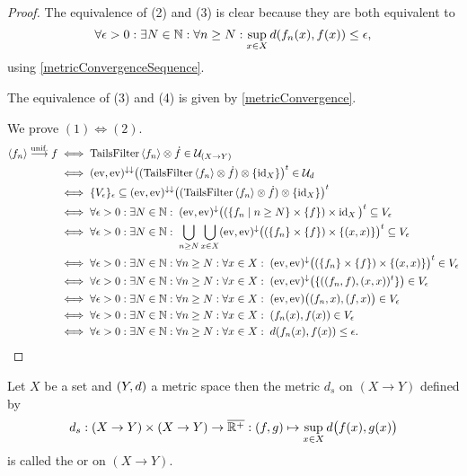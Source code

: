 \begin{proof}
The equivalence of (2) and (3) is clear because they are both equivalent to
\[ \forall \epsilon > 0: \exists N\in \mathbb{N}: \forall n \geq N: \sup_{x\in X} d(f_n(x), f(x)) \leq \epsilon, \]
using \ref{metricConvergenceSequence}.

The equivalence of (3) and (4) is given by \ref{metricConvergence}.

We prove $(1) \Leftrightarrow (2)$.
\begin{align*}
\seq{f_n} \overset{\text{unif.}}{\longrightarrow} f &\iff \TailsFilter\seq{f_n} \otimes \pfilter{f} \in \mathcal{U}_{(X\to Y)} \\
&\iff (\evalMap, \evalMap)^{\imf\imf}\big((\TailsFilter\seq{f_n} \otimes \pfilter{f})\otimes \{\id_X\}\big)^\ttransp \in \mathcal{U}_d \\
&\iff \{V_\epsilon\}_\epsilon \subseteq (\evalMap, \evalMap)^{\imf\imf}\big((\TailsFilter\seq{f_n} \otimes \pfilter{f})\otimes \{\id_X\}\big)^\ttransp \\
&\iff \forall \epsilon>0: \exists N\in \N: \; (\evalMap, \evalMap)^{\imf}\big((\setbuilder{f_n}{n\geq N} \times \{f\})\times \id_X\big)^\ttransp \subseteq V_\epsilon \\
&\iff \forall \epsilon>0: \exists N\in \N: \; \bigcup_{n\geq N}\bigcup_{x\in X}(\evalMap, \evalMap)^{\imf}\big((\{f_n\} \times \{f\})\times \{(x,x)\}\big)^\ttransp \subseteq V_\epsilon \\
&\iff \forall \epsilon>0: \exists N\in \N: \forall n\geq N: \forall x\in X: \;(\evalMap, \evalMap)^{\imf}\big((\{f_n\} \times \{f\})\times \{(x,x)\}\big)^\ttransp \in V_\epsilon \\
&\iff \forall \epsilon>0: \exists N\in \N: \forall n\geq N: \forall x\in X: \; (\evalMap, \evalMap)^{\imf}\big(\{((f_n, f), (x,x))^\ttransp\}\big) \in V_\epsilon \\
&\iff \forall \epsilon>0: \exists N\in \N: \forall n\geq N: \forall x\in X: \; (\evalMap, \evalMap)\big((f_n,x),(f,x)\big) \in V_\epsilon \\
&\iff \forall \epsilon>0: \exists N\in \N: \forall n\geq N: \forall x\in X: \; (f_n(x), f(x)) \in V_\epsilon \\
&\iff \forall \epsilon>0: \exists N\in \N: \forall n\geq N: \forall x\in X: \; d(f_n(x), f(x)) \leq \epsilon.
\end{align*}
\end{proof}


\begin{definition}
Let $X$ be a set and $\sSet{Y,d}$ a metric space then the metric $d_s$ on $(X\to Y)$ defined by
\[ d_s: (X\to Y)\times (X\to Y) \to \overline{\mathbb{R}^+}: (f,g) \mapsto \sup_{x\in X}d\big(f(x), g(x)\big) \]
is called the  or  on $(X\to Y)$.
\end{definition}

